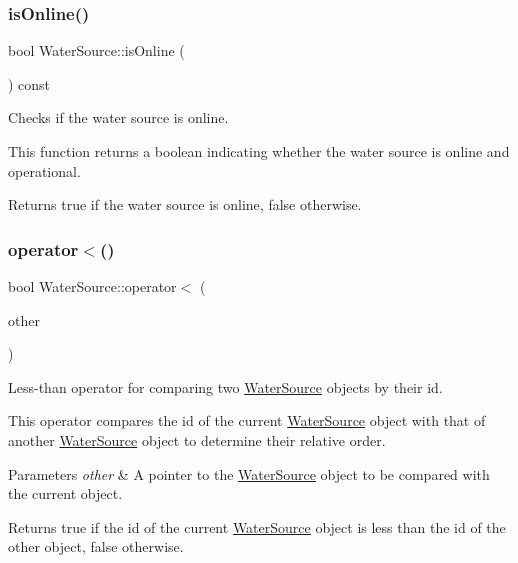 \subsubsection{\texorpdfstring{is\+Online()}{isOnline()}}
{\footnotesize\ttfamily bool Water\+Source\+::is\+Online (\begin{DoxyParamCaption}{ }\end{DoxyParamCaption}) const}



Checks if the water source is online. 

This function returns a boolean indicating whether the water source is online and operational.

\begin{DoxyReturn}{Returns}
{\ttfamily true} if the water source is online, {\ttfamily false} otherwise. 
\end{DoxyReturn}
\mbox{\label{classWaterSource_accb044cc78f9a444ca18bf7283b5b596}} 
\subsubsection{\texorpdfstring{operator$<$()}{operator<()}}
{\footnotesize\ttfamily bool Water\+Source\+::operator$<$ (\begin{DoxyParamCaption}\item[{const \mbox{\hyperlink{classWaterSource}{Water\+Source}} $\ast$}]{other }\end{DoxyParamCaption})}



Less-\/than operator for comparing two {\ttfamily \mbox{\hyperlink{classWaterSource}{Water\+Source}}} objects by their {\ttfamily id}. 

This operator compares the {\ttfamily id} of the current {\ttfamily \mbox{\hyperlink{classWaterSource}{Water\+Source}}} object with that of another {\ttfamily \mbox{\hyperlink{classWaterSource}{Water\+Source}}} object to determine their relative order.


\begin{DoxyParams}{Parameters}
{\em other} & A pointer to the {\ttfamily \mbox{\hyperlink{classWaterSource}{Water\+Source}}} object to be compared with the current object.\\
\hline
\end{DoxyParams}
\begin{DoxyReturn}{Returns}
{\ttfamily true} if the {\ttfamily id} of the current {\ttfamily \mbox{\hyperlink{classWaterSource}{Water\+Source}}} object is less than the {\ttfamily id} of the {\ttfamily other} object, {\ttfamily false} otherwise. 
\end{DoxyReturn}
\mbox{\label{classWaterSource_af10a33e286cf44b362984ff8d8053c91}} 
